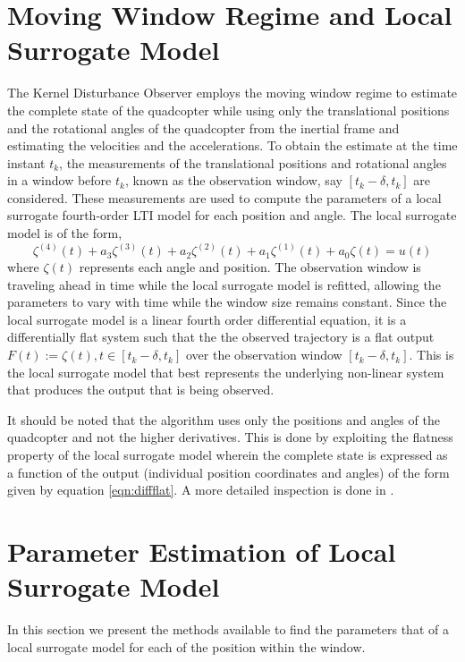 \documentclass[letterpaper%
, twoside%
, 12pt%
,memoire%
, english%
,creativecommons,hyperref%
]{thETS}
\begin{document}
\section{Moving Window Regime and Local Surrogate Model} \label{Sec:MovWin}
The Kernel Disturbance Observer employs the moving window regime to estimate the complete state of the quadcopter while using only the translational positions and the rotational angles of the quadcopter from the inertial frame and estimating the velocities and the accelerations. To obtain the estimate at the time instant $t_k$, the measurements of the translational positions and rotational angles in a window before $t_k$, known as the observation window, say $[t_k-\delta, t_k]$ are considered. These measurements are used to compute the parameters of a local surrogate fourth-order LTI model for each position and angle.  The local surrogate model is of the form,
\begin{equation} \label{eqn:local}
\zeta^{(4)}(t) + a_{3}\zeta^{(3)}(t) + a_{2} \zeta^{(2)}(t) + a_{1}\zeta^{(1)}(t) + a_{0}\zeta(t) = u(t)
\end{equation}
where $\zeta(t)$ represents each angle and position. The observation window is traveling ahead in time while the local surrogate model is refitted, allowing the parameters to vary with time while the window size remains constant. Since the local surrogate model is a linear fourth order differential equation, it is a differentially flat system such that the the observed trajectory is a flat output $F(t) := \zeta(t), t \in [t_k-\delta,t_{k}]$ over the observation window $[t_k-\delta,t_k]$. This is the local surrogate model that best represents the underlying non-linear system that produces the output that is being observed.  

It should be noted that the algorithm uses only the positions and angles of the quadcopter and not the higher derivatives. This is done by exploiting the flatness property of the local surrogate model wherein the complete state is expressed as a function of the output (individual position coordinates and angles) of the form given by equation \eqref{eqn:diffflat}. A more detailed inspection is done in \citep{pandey2018variational}. 

\section{Parameter Estimation of Local Surrogate Model} \label{Sec:ParEst}
In this section we present the methods available to find the parameters that of a local surrogate model for each of the position within the window.
\end{document}
